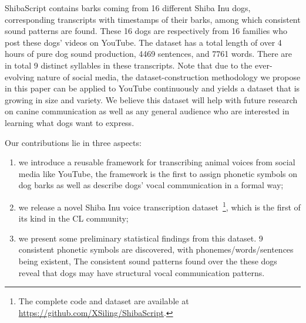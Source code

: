 
ShibaScript contains barks coming from 16 different Shiba Inu dogs, corresponding transcripts with timestamps of their barks, among which consistent sound patterns are found. These 16 dogs are respectively from 16 families who post these dogs' videos on YouTube. The dataset has a total length of over 4 hours of pure dog sound production, 4469 sentences, and 7761 words. There are in total 9 distinct syllables in these transcripts. 
Note that due to the ever-evolving nature of social media, the dataset-construction methodology we propose in this paper can be applied to YouTube continuously and yields a dataset that is growing in size and variety. We believe this dataset will help with future research on canine communication as well as any general audience who are interested in learning what dogs want to express.

Our contributions lie in three aspects: 
\begin{enumerate}
\item we introduce a reusable framework for transcribing animal voices from social media like YouTube, the framework is the first to assign phonetic symbols on dog barks as well as describe dogs' vocal communication in a formal way; 
\item we release a novel Shiba Inu voice transcription dataset~\footnote{The complete code and dataset are available at \url{https://github.com/XSiling/ShibaScript}.}, which is the first of its kind in the CL community; 
\item we present some preliminary statistical findings from this dataset. 9 consistent phonetic symbols are discovered, with phonemes/words/sentences being existent, The consistent sound patterns found over the these dogs reveal that dogs may have structural vocal communication patterns.
\end{enumerate}

